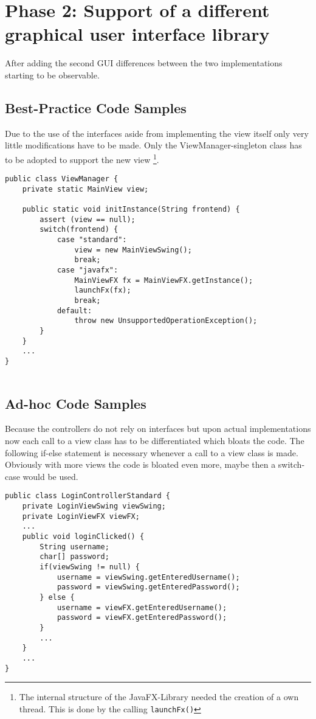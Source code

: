 \clearpage

\section{Phase 2: Support of a different graphical user interface library}
After adding the second GUI differences between the two implementations starting to be observable.

\subsection{Best-Practice Code Samples}
Due to the use of the interfaces aside from implementing the view itself only very little modifications have to be made. Only the ViewManager-singleton class has to be adopted to support the new view \footnote{The internal structure of the JavaFX-Library needed the creation of a own thread. This is done by the calling \texttt{launchFx()}}.

\begin{lstlisting}[caption={View Manager after implementation of a second GUI. Only a case branch has to be added.}, captionpos=b]
public class ViewManager {
	private static MainView view;
	
	public static void initInstance(String frontend) {
		assert (view == null);
		switch(frontend) {
			case "standard":
				view = new MainViewSwing();
				break;
			case "javafx":
				MainViewFX fx = MainViewFX.getInstance();
				launchFx(fx);
				break;
			default:
				throw new UnsupportedOperationException();
		}
	}
	...
}
	
\end{lstlisting}

\subsection{Ad-hoc Code Samples}
\label{sec:ad-hoc-javafx}
Because the controllers do not rely on interfaces but upon actual implementations now each call to a view class has to be differentiated which bloats the code. The following if-else statement is necessary whenever a call to a view class is made. Obviously with more views the code is bloated even more, maybe then a switch-case would be used.

\begin{lstlisting}[caption={Code snipped showing login-code after implementing a second GUI. Because no interface but concrete implementations are used each time a view access is needed the program is required to check for which of the two GUIs is currently active. Controller methods of the best pratice version do not change in any way.}, captionpos=b, label={lst:controller-switch}]
public class LoginControllerStandard {
	private LoginViewSwing viewSwing;
	private LoginViewFX viewFX;
	...
	public void loginClicked() {
		String username;
		char[] password;
		if(viewSwing != null) {
			username = viewSwing.getEnteredUsername();
			password = viewSwing.getEnteredPassword();
		} else {
			username = viewFX.getEnteredUsername();
			password = viewFX.getEnteredPassword();
		}
		...
	}
	...
}
\end{lstlisting}


